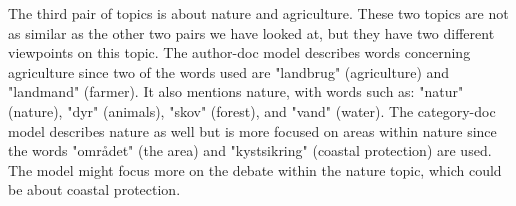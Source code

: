 The third pair of topics is about nature and agriculture.
These two topics are not as similar as the other two pairs we have looked at, but they have two different viewpoints on this topic.
The author-doc model describes words concerning agriculture since two of the words used are "landbrug" (agriculture) and "landmand" (farmer). 
It also mentions nature, with words such as: "natur" (nature), "dyr" (animals), "skov" (forest), and "vand" (water).
The category-doc model describes nature as well but is more focused on areas within nature since the words "området" (the area) and "kystsikring" (coastal protection) are used.
The model might focus more on the debate within the nature topic, which could be about coastal protection.    
